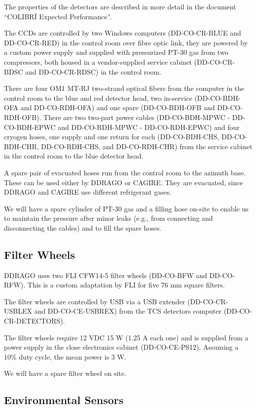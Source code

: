 \documentclass{article}
\begin{document}
The properties of the detectors are described in more detail in the document “COLIBRÍ Expected Performance”.

The CCDs are controlled by two Windows computers (DD-CO-CR-BLUE and DD-CO-CR-RED) in the control room over fibre optic link, they are powered by a custom power supply and supplied with pressurized PT-30 gas from two compressors, both housed in a vendor-supplied service cabinet (DD-CO-CR-BDSC and DD-CO-CR-RDSC) in the control room.

There are four OM1 MT-RJ two-strand optical fibers from the computer in the control room to the blue and red detector head, two in-service (DD-CO-BDH-OFA and DD-CO-RDH-OFA) and one spare (DD-CO-BDH-OFB and DD-CO-RDH-OFB). There are two two-part power cables (DD-CO-BDH-MPWC - DD-CO-BDH-EPWC and DD-CO-RDH-MPWC - DD-CO-RDH-EPWC) and four cryogen hoses, one supply and one return for each (DD-CO-BDH-CHS, DD-CO-BDH-CHR, DD-CO-RDH-CHS, and DD-CO-RDH-CHR) from the service cabinet in the control room to the blue detector head. 

A spare pair of evacuated hoses run from the control room to the azimuth base. These can be used either by DDRAGO or CAGIRE. They are evacuated, since DDRAGO and CAGIRE use different refrigerant gases.

We will have a spare cylinder of PT-30 gas and a filling hose on-site to enable us to maintain the pressure after minor leaks (e.g., from connecting and disconnecting the cables) and to fill the spare hoses.

\subsection{Filter Wheels}

DDRAGO uses two FLI CFW14-5 filter wheels (DD-CO-BFW and DD-CO-RFW). This is a custom adaptation by FLI for five 76 mm square filters.

The filter wheels are controlled by USB via a USB extender (DD-CO-CR-USBLEX and DD-CO-CE-USBREX) from the TCS detectors computer (DD-CO-CR-DETECTORS).

The filter wheels require 12 VDC 15 W (1.25 A each one) and is supplied from a power supply in the close electronics cabinet (DD-CO-CE-PS12). Assuming a 10\% duty cycle, the mean power is 3 W.

We will have a spare filter wheel on site.

\subsection{Environmental Sensors}
\end{document}
